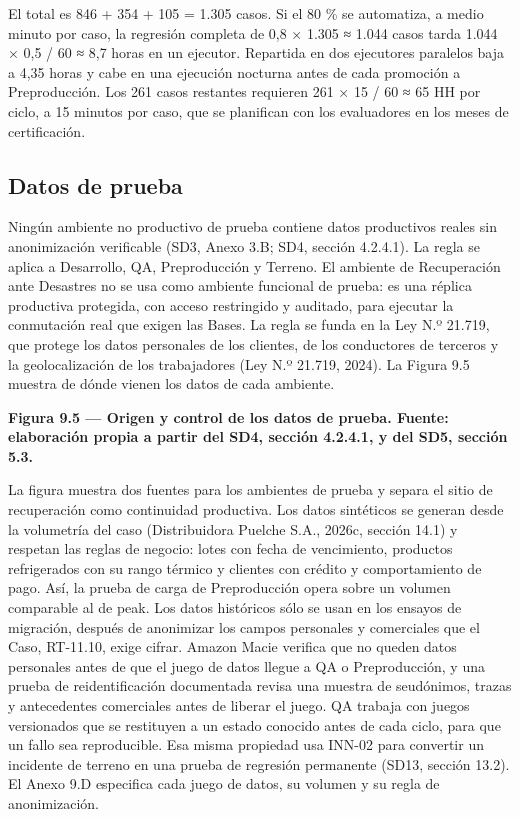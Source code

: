 El total es 846 + 354 + 105 = 1.305 casos. Si el 80 \% se automatiza, a medio minuto por caso, la regresión completa de 0,8 × 1.305 ≈ 1.044 casos tarda 1.044 × 0,5 / 60 ≈ 8,7 horas en un ejecutor. Repartida en dos ejecutores paralelos baja a 4,35 horas y cabe en una ejecución nocturna antes de cada promoción a Preproducción. Los 261 casos restantes requieren 261 × 15 / 60 ≈ 65 HH por ciclo, a 15 minutos por caso, que se planifican con los evaluadores en los meses de certificación.

\subsection{Datos de prueba}

Ningún ambiente no productivo de prueba contiene datos productivos reales sin anonimización verificable (SD3, Anexo 3.B; SD4, sección 4.2.4.1). La regla se aplica a Desarrollo, QA, Preproducción y Terreno. El ambiente de Recuperación ante Desastres no se usa como ambiente funcional de prueba: es una réplica productiva protegida, con acceso restringido y auditado, para ejecutar la conmutación real que exigen las Bases. La regla se funda en la Ley N.º 21.719, que protege los datos personales de los clientes, de los conductores de terceros y la geolocalización de los trabajadores (Ley N.º 21.719, 2024). La Figura 9.5 muestra de dónde vienen los datos de cada ambiente.



\textbf{Figura 9.5 — Origen y control de los datos de prueba. Fuente: elaboración propia a partir del SD4, sección 4.2.4.1, y del SD5, sección 5.3.}

La figura muestra dos fuentes para los ambientes de prueba y separa el sitio de recuperación como continuidad productiva. Los datos sintéticos se generan desde la volumetría del caso (Distribuidora Puelche S.A., 2026c, sección 14.1) y respetan las reglas de negocio: lotes con fecha de vencimiento, productos refrigerados con su rango térmico y clientes con crédito y comportamiento de pago. Así, la prueba de carga de Preproducción opera sobre un volumen comparable al de peak. Los datos históricos sólo se usan en los ensayos de migración, después de anonimizar los campos personales y comerciales que el Caso, RT-11.10, exige cifrar. Amazon Macie verifica que no queden datos personales antes de que el juego de datos llegue a QA o Preproducción, y una prueba de reidentificación documentada revisa una muestra de seudónimos, trazas y antecedentes comerciales antes de liberar el juego. QA trabaja con juegos versionados que se restituyen a un estado conocido antes de cada ciclo, para que un fallo sea reproducible. Esa misma propiedad usa INN-02 para convertir un incidente de terreno en una prueba de regresión permanente (SD13, sección 13.2). El Anexo 9.D especifica cada juego de datos, su volumen y su regla de anonimización.

